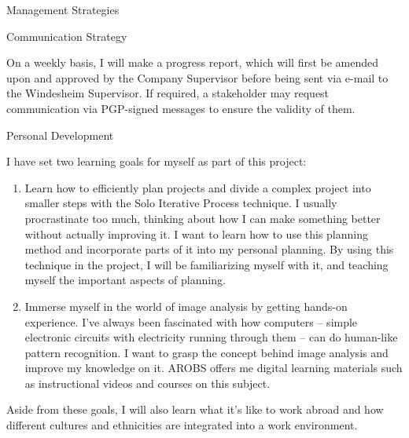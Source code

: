 \documentclass{matthijs}
\begin{document}
\begin{hoofdstuk}{Management Strategies}
\begin{paragraaf}{Communication Strategy}
			\bigskip
			
			On a weekly basis, I will make a progress report, which will first be amended upon and approved by the Company Supervisor before being sent via e-mail to the Windesheim Supervisor.
			If required, a stakeholder may request communication via PGP-signed messages to ensure the validity of them.

		\end{paragraaf}

	\end{hoofdstuk}

	\begin{hoofdstuk}{Personal Development}

		I have set two learning goals for myself as part of this project:

		\begin{enumerate}
			\item Learn how to efficiently plan projects and divide a complex project into smaller steps with the Solo Iterative Process technique. I usually procrastinate too much, thinking about how I can make something better without actually improving it. I want to learn how to use this planning method and incorporate parts of it into my personal planning. By using this technique in the project, I will be familiarizing myself with it, and teaching myself the important aspects of planning.
			\item Immerse myself in the world of image analysis by getting hands-on experience. I've always been fascinated with how computers -- simple electronic circuits with electricity running through them -- can do human-like pattern recognition. I want to grasp the concept behind image analysis and improve my knowledge on it. AROBS offers me digital learning materials such as instructional videos and courses on this subject.
		\end{enumerate}

		Aside from these goals, I will also learn what it's like to work abroad and how different cultures and ethnicities are integrated into a work environment.

	\end{hoofdstuk}
\end{document}

